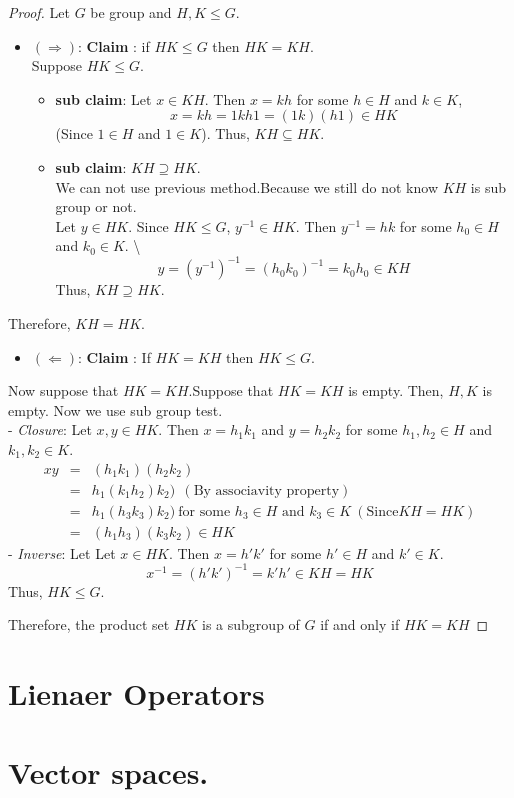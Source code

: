 \documentclass[
]{book}
\providecommand{\tightlist}{%
  \setlength{\itemsep}{0pt}\setlength{\parskip}{0pt}}
\theoremstyle{definition}
\theoremstyle{definition}
\theoremstyle{definition}
\theoremstyle{definition}
\theoremstyle{remark}
\begin{document}
\begin{proof}
Let \(G\) be group and \(H,K\leq G\).

\begin{itemize}
\item
  \((\Longrightarrow)\): \textbf{Claim }: if \(HK\leq G\) then \(HK=KH\).\\

  Suppose \(HK\leq G\).

  \begin{itemize}
  \tightlist
  \item
    \textbf{sub claim}:
    Let \(x\in KH\). Then \(x=kh\) for some \(h\in H\) and \(k\in K\),
    \[x=kh=1kh1=(1k)(h1)\in HK\]
    (Since \(1\in H\) and \(1\in K\)). Thus, \(KH \subseteq HK\).\\
  \item
    \textbf{sub claim}: \(KH \supseteq HK\).\\
    We can not use previous method.Because we still do not know \(KH\) is sub group or not.\\
    Let \(y\in HK\). Since \(HK\leq G\), \(y^{-1}\in HK\). Then \(y^{-1}=hk\) for some \(h_0\in H\) and \(k_0\in K\). \textbackslash{}
    \[y=(y^{-1})^{-1}=(h_0k_0)^{-1}=k_0h_0\in KH\]
    Thus, \(KH \supseteq HK\).
  \end{itemize}
\end{itemize}

Therefore, \(KH=HK\).

\begin{itemize}
\tightlist
\item
  \((\Longleftarrow)\): \textbf{Claim }: If \(HK=KH\) then \(HK\leq G\).\\
\end{itemize}

Now suppose that \(HK=KH\).Suppose that \(HK=KH\) is empty. Then, \(H,K\) is empty. Now we use sub group test.\\
- \emph{Closure}: Let \(x,y\in HK\). Then \(x=h_1k_1\) and \(y=h_2k_2\) for some \(h_1,h_2\in H\) and \(k_1,k_2\in K\).
\begin{eqnarray}
  xy&=&(h_1k_1)(h_2k_2)\\
  &=& h_1(k_1h_2)k_2) ~~(\text{By associavity property})\\
  &=& h_1(h_3k_3)k_2) ~\text{for some  }h_3\in H \text{ and } k_3\in K ~(\text{Since} KH=HK)\\
  &=& (h_1h_3)(k_3k_2)\in HK
\end{eqnarray}
- \emph{Inverse}: Let Let \(x\in HK\). Then \(x=h'k'\) for some \(h'\in H\) and \(k'\in K\).
\[x^{-1}=(h'k')^{-1}=k'h'\in KH=HK\]
Thus, \(HK\leq G\).

Therefore, the product set \(HK\) is a subgroup of \(G\) if and only if \(HK = KH\)
\end{proof}

\hypertarget{lienaer-operators}{%
\chapter{Lienaer Operators}\label{lienaer-operators}}

\hypertarget{vector-spaces.}{%
\chapter{Vector spaces.}\label{vector-spaces.}}

  
\end{document}

